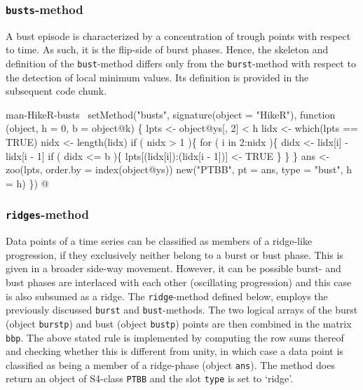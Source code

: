 \documentclass[a4paper]{article}
\begin{document}
\subsubsection{\texttt{busts}-method}
A bust episode is characterized by a concentration of trough points
with respect to time. As such, it is the flip-side of burst
phases. Hence, the skeleton and definition of the \verb?bust?-method
differs only from the \verb?burst?-method with respect to the detection
of local minimum values. Its definition is provided in the subsequent
code chunk.

\nwenddocs{}\endmoddef
\LA{}man-HikeR-busts~{\nwtagstyle{}}\RA{}
setMethod("busts",
    signature(object = "HikeR"),
    function (object, h = 0, b = object@k) \{
        lpts <- object@ys[, 2] < h
        lidx <- which(lpts == TRUE)
        nidx <- length(lidx)
        if ( nidx > 1 )\{
            for ( i in 2:nidx )\{
                didx <- lidx[i] - lidx[i - 1]
                if ( didx <= b )\{
                    lpts[(lidx[i]):(lidx[i - 1])] <- TRUE
                \}
            \}
        \}
        ans <- zoo(lpts, order.by = index(object@ys))
        new("PTBB", pt = ans, type = "bust", h = h)
\})
\nwendcode{}@

\subsubsection{\texttt{ridges}-method}
Data points of a time series can be classified as members of a
ridge-like progression, if they exclusively neither belong to a burst
or bust phase. This is given in a broader side-way movement. However,
it can be possible burst- and bust phases are interlaced with each
other (oscillating progression) and this case is also subsumed as a
ridge. The \verb?ridge?-method defined below, employs the previously
discussed \verb?burst? and \verb?bust?-methods. The two logical arrays of
the burst (object \verb?burstp?) and bust (object \verb?bustp?) points are
then combined in the matrix \verb?bbp?. The above stated rule is
implemented by computing the row sums thereof and checking whether this
is different from unity, in which case a data point is classified as
being a member of a ridge-phase (object \verb?ans?). The method does
return an object of S4-class \verb?PTBB? and the slot \verb?type? is set to
`ridge'.
\end{document}
